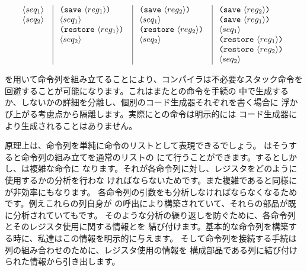 \begin{comment}

\begin{smallexample}
<seq_1> | (save <reg_1>)    | (save <reg_2>)    | (save <reg_2>)
<seq_2> | <seq_1>           | <seq_1>           | (save <reg_1>)
        | (restore <reg_1>) | (restore <reg_2>) | <seq_1>
        | <seq_2>           | <seq_2>           | (restore <reg_1>)
        |                   |                   | (restore <reg_2>)
        |                   |                   | <seq_2>
\end{smallexample}

\end{comment}
\begin{displaymath}
\vbox{
\offinterlineskip
\halign{
\strut 	\kern0.8em # \kern0.4em \hfil & \vrule 
	\kern0.8em # \kern0.4em \hfil & \vrule
	\kern0.8em # \kern0.4em \hfil & \vrule
	\kern0.8em # \kern0.4em \hfil \cr

$\langle{seq_1}\rangle$ 			& \hbox{\tt (save} $\langle{reg_1}\rangle${\tt)} & 
\hbox{\tt (save} $\langle{reg_2}\rangle${\tt)} 	& \hbox{\tt (save} $\langle{reg_2}\rangle${\tt)} \cr

$\langle{seq_2}\rangle$ 			& $\langle{seq_1}\rangle$	& 
$\langle{seq_1}\rangle$ 			& \hbox{\tt (save} $\langle{reg_1}\rangle${\tt)} \cr

						& \hbox{\tt (restore} $\langle{reg_1}\rangle${\tt)} & 
\hbox{\tt (restore} $\langle{reg_2}\rangle${\tt)} 	& $\langle{seq_1}\rangle$ \cr

						& $\langle{seq_2}\rangle$ & 
$\langle{seq_2}\rangle$				& \hbox{\tt (restore} $\langle{reg_1}\rangle${\tt)} \cr

						&  &
			      			& \hbox{\tt (restore} $\langle{reg_2}\rangle${\tt)} \cr

						&  &
			      			& $\langle{seq_2}\rangle$ \cr
}
}
\end{displaymath}

\noindent
{}を用いて命令列を組み立てることにより、コンパイラは不必要なスタック命令を
回避することが可能になります。これはまたとの命令を手続の
中で生成するか、しないかの詳細を分離し、個別のコード生成器それぞれを書く場合に
浮かび上がる考慮点から隔離します。実際にとの命令は明示的には
コード生成器により生成されることはありません。

原理上は、命令列を単純に命令のリストとして表現できるでしょう。
はそうすると命令列の組み立てを通常のリストの
にて行うことができます。するとしかし、は複雑な命令に
なります。それが各命令列に対し、レジスタをどのように使用するかの分析を行わな
ければならないためです。また複雑であると同様にが非効率にもなります。
各命令列の引数をも分析しなければならなくなるためです。例えこれらの列自身が
の呼出により構築されていて、それらの部品が既に分析されていてもです。
そのような分析の繰り返しを防ぐために、各命令列とそのレジスタ使用に関する情報とを
結び付けます。基本的な命令列を構築する時に、私達はこの情報を明示的に与えます。
そして命令列を接続する手続は列の組み合わせのために、レジスタ使用の情報を
構成部品である列に結び付けられた情報から引き出します。


